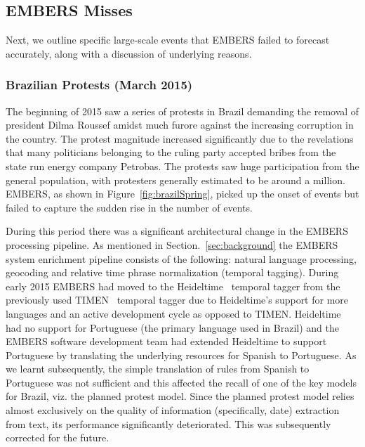 \documentclass[11pt,a4paper,extrafontsizes,oneside]{article}
\begin{document}
\subsection{EMBERS Misses}
Next, we outline specific large-scale events that
EMBERS failed to forecast accurately, along with a discussion of underlying
reasons.

\subsubsection{Brazilian Protests (March 2015)}
The beginning of 2015 saw a series of protests in Brazil demanding the
removal of president Dilma Roussef amidst much furore against the increasing corruption in the country.
The protest magnitude increased significantly due to the revelations that many politicians belonging
to the ruling party accepted bribes from the state run energy company Petrobas. The protests saw huge participation from
the general population, with protesters generally estimated to be around a
million. EMBERS, as shown in Figure~\ref{fig:brazilSpring},
picked up the onset of events but failed to capture the sudden rise in the number of events.

During this period there was a significant architectural change in the
EMBERS processing pipeline. As mentioned in Section.~\ref{sec:background} the
EMBERS system enrichment pipeline consists of the following: natural language processing,
geocoding and relative time phrase normalization (temporal tagging). During early 2015
EMBERS had moved to the Heideltime~\cite{heideltime} temporal
tagger from the previously used TIMEN~\cite{timen} temporal tagger due to
Heideltime's support for more languages and an active development cycle as
opposed to TIMEN.
Heideltime had no support for Portuguese (the primary
language used in Brazil) and the EMBERS software development team had extended Heideltime to
support Portuguese by translating the underlying
resources for Spanish to Portuguese. As we learnt subsequently,
the simple translation of rules from Spanish to Portuguese
was not sufficient and this affected the recall of one of the key models
for Brazil, viz. the planned protest model.
Since the planned protest model relies
almost exclusively on the quality of information (specifically, date) extraction from text,
its performance significantly deteriorated. This was subsequently corrected for the future.
\end{document}

